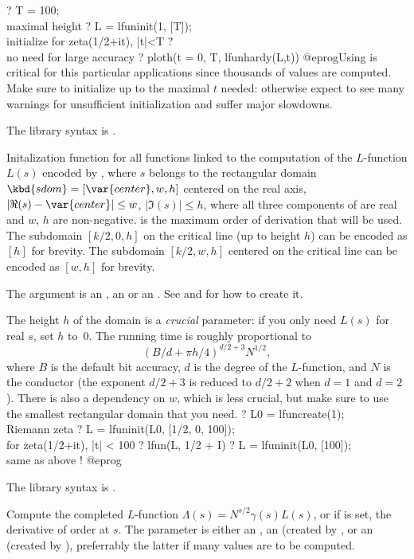 \bprog
? T = 100; \\ maximal height
? L = lfuninit(1, [T]); \\ initialize for zeta(1/2+it), |t|<T
?  \\ no need for large accuracy
? ploth(t = 0, T, lfunhardy(L,t))
@eprog\noindent Using  is critical for this particular
applications since thousands of values are computed. Make sure to initialize
up to the maximal $t$ needed: otherwise expect to see many warnings for
unsufficient initialization and suffer major slowdowns.

The library syntax is .

\label{se:lfuninit}
Initalization function for all functions linked to the
computation of the $L$-function $L(s)$ encoded by , where
$s$ belongs to the rectangular domain $\kbd{sdom} = [\var{center},w,h]$
centered on the real axis, $|\Re(s)-\var{center}| \leq w$, $|\Im(s)| \leq h$,
where all three components of  are real and $w$, $h$ are
non-negative.  is the maximum order of derivation that will be used.
The subdomain $[k/2, 0, h]$ on the critical line (up to height $h$)
can be encoded as $[h]$ for brevity. The subdomain $[k/2, w, h]$
centered on the critical line can be encoded as $[w, h]$ for brevity.

The argument  is an , an  or an . See
 and  for how to create it.

The height $h$ of the domain is a \emph{crucial} parameter: if you only
need $L(s)$ for real $s$, set $h$ to~0.
The running time is roughly proportional to
$$(B / d+\pi h/4)^{d/2+3}N^{1/2},$$
where $B$ is the default bit accuracy, $d$ is the degree of the
$L$-function, and $N$ is the conductor (the exponent $d/2+3$ is reduced
to $d/2+2$ when $d=1$ and $d=2$). There is also a dependency on $w$,
which is less crucial, but make sure to use the smallest rectangular
domain that you need.
\bprog
? L0 = lfuncreate(1); \\ Riemann zeta
? L = lfuninit(L0, [1/2, 0, 100]); \\ for zeta(1/2+it), |t| < 100
? lfun(L, 1/2 + I)
? L = lfuninit(L0, [100]); \\ same as above !
@eprog

The library syntax is .

\label{se:lfunlambda}
Compute the completed $L$-function $\Lambda(s) = N^{s/2}\gamma(s)L(s)$,
or if  is set, the derivative of order  at $s$.
The parameter  is either an , an  (created by
, or an  (created by ), preferrably the
latter if many values are to be computed.

